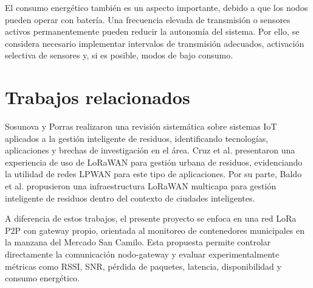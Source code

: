 El consumo energético también es un aspecto importante, debido a que los nodos pueden operar con batería. Una frecuencia elevada de transmisión o sensores activos permanentemente pueden reducir la autonomía del sistema. Por ello, se considera necesario implementar intervalos de transmisión adecuados, activación selectiva de sensores y, si es posible, modos de bajo consumo.

\section{Trabajos relacionados}

Sosunova y Porras \cite{sosunova2022smartwaste} realizaron una revisión sistemática sobre sistemas IoT aplicados a la gestión inteligente de residuos, identificando tecnologías, aplicaciones y brechas de investigación en el área. Cruz et al. \cite{cruz2021lorawanwaste} presentaron una experiencia de uso de LoRaWAN para gestión urbana de residuos, evidenciando la utilidad de redes LPWAN para este tipo de aplicaciones. Por su parte, Baldo et al. \cite{baldo2021multilayer} propusieron una infraestructura LoRaWAN multicapa para gestión inteligente de residuos dentro del contexto de ciudades inteligentes.

A diferencia de estos trabajos, el presente proyecto se enfoca en una red LoRa P2P con gateway propio, orientada al monitoreo de contenedores municipales en la manzana del Mercado San Camilo. Esta propuesta permite controlar directamente la comunicación nodo-gateway y evaluar experimentalmente métricas como RSSI, SNR, pérdida de paquetes, latencia, disponibilidad y consumo energético.